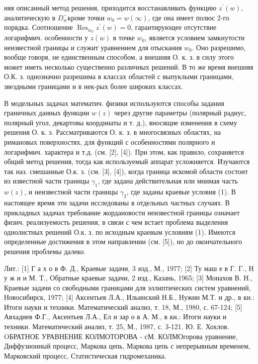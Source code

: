 \documentclass[10pt]{article}
\begin{document}
няя описанный метод решения, приходится восстанавливать функцию $z^{\prime}(w)$, аналитическую в $D_{w}^{-}$кроме точки $w_{0}=w(\infty)$, где она имеет полюс 2-го порядка. Соотношение $\operatorname{Res}_{w_{0}} z^{\prime}(w)=0$, гарантирующее отсутствие логарифмич. особенности у $z(w)$ в точке $w_{0}$, является условием замкнутости неизвестной границы и служит уравнением для отыскания $w_{0}$. Оно разрешимо, вообще говоря, не единственным способом, а внешняя О. к. з. в силу этого может иметь несколько существенно различных решений. В то же время внешняя О.К. з. однозначно разрешима в классах областей с выпуклыми границами, звездными границами и в нек-рых более широких классах.



В модельных задачах математич. физики используются способы задания граничных данных функции $w(z)$ через другие параметры (полярный радиус, полярный угол, декартовы координаты и т. д.), вносящие изменения в схему решения О. к. з. Рассматриваются О. к. з. в многосвязных областях, на римановых поверхностях, для функций с особенностями полярного и логарифмич. характера и т.д. (см. [2], [4]). При этом, как правило, сохраняется общий метод решения, тогда как используемый аппарат усложняется. Изучаются так наз. смешанные О.к. з. (см. [3], [4]), когда граница искомой области состоит из известной части границы $\gamma_{1}$, где задана действительная или мнимая часть $w(z)$, и неизвестной части границы $\gamma_{2}$, где заданы краевые условия (1). В настоящее время эти задачи исследованы в отдельных частных случаях. В прикладных задачах требование жордановости неизвестной границы означает физич. реализуемость решения, в связи с чем встает проблема выделения однолистных решений О.к. з. по исходным краевым условиям (1). Имеются определенные достижения в этом направлении (см. [5]), но до окончательного решения проблемы далеко.



Лит.: [1] Г а х о в Ф. Д., Краевые задачи, 3 изд., М., 1977; [2] Ту маш е в Г. Г., Н у ж и н М. Т., Обратные краевые задачи, 2 изд., Казань, 1965; [3] Монахов В. Н., Краевые задачи со свободными границами для эллиптических систем уравнений, Новосибирск, 1977; [4] Аксентьев Л.А., Ильинский Н.Б., Нужин М.Т. и др., в кн.: Итоги науки и техники. Математический анализ, т. 18, М., 1980, с. 67-124; [5] Авхадиев Ф.Г., Аксентьев Л.А., Ел и зар о в А. М., в кн.: Итоги науки и техники. Математический анализ, т. 25, М., 1987, с. 3-121. Ю. Е. Хохлов. OБРАТНОЕ УРАВНЕНИЕ КОЛМОТОРОВА - сМ. КОЛМОгорова уравнение, Диффузионный процесс, Маркова цепь, Маркова цепь с непрерывным временем, Марковский процесс, Статистическая гидромеханика.
\end{document}
